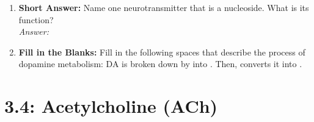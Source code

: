 \begin{enumerate}[label=\textbf{Q3.3.\arabic*}]
    \item \textbf{Short Answer:} Name one neurotransmitter that is a nucleoside. What is its function? \\
        \textit{Answer:} %

    \item \textbf{Fill in the Blanks:} Fill in the following spaces that describe the process of dopamine metabolism:
    DA is broken down by \underline{\hspace{3cm}} into \underline{\hspace{3cm}}. Then, \underline{\hspace{3cm}} converts it into \underline{\hspace{3cm}}. \\
\end{enumerate}

\squigglyline
\section*{3.4: Acetylcholine (ACh)}

